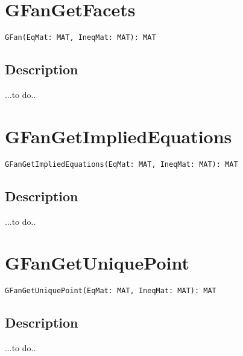 \documentclass[a4paper]{mybook}
\newenvironment{command}{}{} %
\begin{document}
\section{GFanGetFacets}
\label{GFanGetFacets}
\begin{command} %


\begin{Verbatim}[label=syntax, rulecolor=\color{MidnightBlue},
frame=single]
GFan(EqMat: MAT, IneqMat: MAT): MAT
\end{Verbatim}


\subsection*{Description}

...to do..

\end{command} %

\section{GFanGetImpliedEquations}
\label{GFanGetImpliedEquations}
\begin{command} %


\begin{Verbatim}[label=syntax, rulecolor=\color{MidnightBlue},
frame=single]
GFanGetImpliedEquations(EqMat: MAT, IneqMat: MAT): MAT
\end{Verbatim}


\subsection*{Description}

...to do..

\end{command} %

\section{GFanGetUniquePoint}
\label{GFanGetUniquePoint}
\begin{command} %


\begin{Verbatim}[label=syntax, rulecolor=\color{MidnightBlue},
frame=single]
GFanGetUniquePoint(EqMat: MAT, IneqMat: MAT): MAT
\end{Verbatim}


\subsection*{Description}

...to do..

\end{command} %
\end{document}

